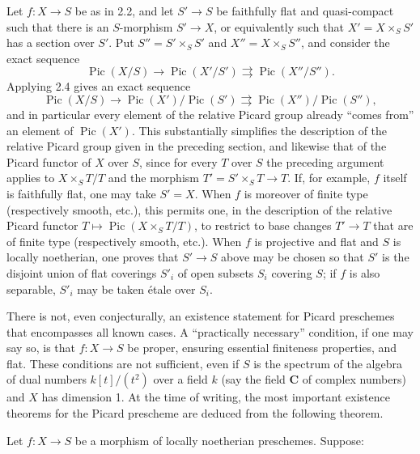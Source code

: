  Let $f:X\longrightarrow S$ be as in 2.2, and let
$S'\longrightarrow S$ be faithfully flat and quasi-compact such that there is
an $S$-morphism $S'\longrightarrow X$, or equivalently such that
$X'=X\times_SS'$ has a section over $S'$. Put $S''=S'\times_SS'$ and
$X''=X\times_SS''$, and consider the exact sequence
\[
\operatorname{Pic}(X/S)\longrightarrow\operatorname{Pic}(X'/S')
\rightrightarrows\operatorname{Pic}(X''/S'').
\]
Applying 2.4 gives an exact sequence
\[
\operatorname{Pic}(X/S)\longrightarrow
\operatorname{Pic}(X')/\operatorname{Pic}(S')
\rightrightarrows
\operatorname{Pic}(X'')/\operatorname{Pic}(S''),
\]
and in particular every element of the relative Picard group already “comes
from” an element of $\operatorname{Pic}(X')$. This substantially simplifies
the description of the relative Picard group given in the preceding section,
and likewise that of the Picard functor of $X$ over $S$, since for every $T$
over $S$ the preceding argument applies to $X\times_ST/T$ and the morphism
$T'=S'\times_ST\longrightarrow T$. If, for example, $f$ itself is faithfully
flat, one may take $S'=X$. When $f$ is moreover of finite type (respectively
smooth, etc.), this permits one, in the description of the relative Picard
functor $T\longmapsto\operatorname{Pic}(X\times_ST/T)$, to restrict to base
changes $T'\longrightarrow T$ that are of finite type (respectively smooth,
etc.). When $f$ is projective and flat and $S$ is locally noetherian, one proves
that $S'\longrightarrow S$ above may be chosen so that $S'$ is the disjoint
union of flat coverings $S'_i$ of open subsets $S_i$ covering $S$; if $f$ is
also separable, $S'_i$ may be taken étale over $S_i$.


There is not, even conjecturally, an existence statement for Picard preschemes
that encompasses all known cases. A “practically necessary” condition, if one
may say so, is that $f:X\longrightarrow S$ be proper, ensuring essential
finiteness properties, and flat. These conditions are not sufficient, even if
$S$ is the spectrum of the algebra of dual numbers $k[t]/(t^2)$ over a field
$k$ (say the field $\mathbf C$ of complex numbers) and $X$ has dimension 1. At
the time of writing, the most important existence theorems for the Picard
prescheme are deduced from the following theorem.

 Let $f:X\longrightarrow S$ be a morphism of locally
noetherian preschemes. Suppose:

